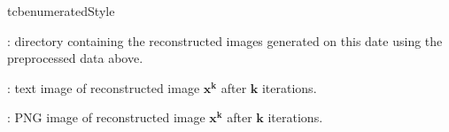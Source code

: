 \begin{tcbenvironment}
\begin{tcbparbox}{tcbenumeratedStyle}
\begin{ThinEnum}
\begin{ThinEnum}
\begin{ThinEnum}
\begin{ThinEnum}
\begin{ThinEnum}
\begin{ThinEnum}
\begin{ThinEnum}
\begin{ThinEnum}
\begin{ThinEnum}
                                        \begin{ThinEnum}
                                            \item {} : directory containing the reconstructed images generated on this date using the preprocessed data above.
                                                \begin{ThinEnum}
                                                    \item {} : text image of reconstructed image $\boldsymbol{x^k}$ after $\boldsymbol{k}$ iterations.
                                                    \item {} : PNG image of reconstructed image $\boldsymbol{x^k}$ after $\boldsymbol{k}$ iterations.%
                                                \end{ThinEnum}
                                        \end{ThinEnum}
                                    \end{ThinEnum}
                                \end{ThinEnum}
                            \end{ThinEnum}
                        \end{ThinEnum}
                    \end{ThinEnum}
                \end{ThinEnum}
            \end{ThinEnum}
        \end{ThinEnum}
    \end{ThinEnum}
\end{tcbparbox}
\end{tcbenvironment}
\endinput
